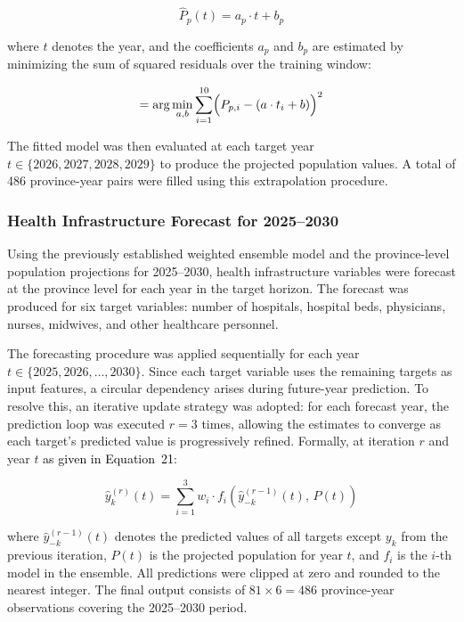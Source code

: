 \documentclass[final, 9pt, twocolumn]{saucis}
\newcommand{\rev}[1]{\textcolor{black}{#1}}
\begin{document}
\begin{equation}
    \hat{P}_{p}(t) = a_p \cdot t + b_p
\end{equation}

where $t$ denotes the year, and the coefficients $a_p$ and $b_p$ are estimated by minimizing the sum of squared residuals over the training window:

\begin{equation}
    [a_p,\, b_p] = \arg\min_{a,b} \sum_{i=1}^{10} 
    \Bigl(P_{p,i} - (a \cdot t_i + b)\Bigr)^{2}
\end{equation}

The fitted model was then evaluated at each target year $t \in \{2026, 2027, 2028, 2029\}$ to produce the projected population values. A total of 486 province-year pairs were filled using this extrapolation procedure.

\subsubsection{Health Infrastructure Forecast for 2025--2030}

Using the previously established weighted ensemble model and the 
province-level population projections for 2025--2030, health 
infrastructure variables were forecast at the province level for 
each year in the target horizon. The forecast was produced for 
six target variables: number of hospitals, hospital beds, physicians, nurses, midwives, and other healthcare personnel.

The forecasting procedure was applied sequentially for each year 
$t \in \{2025, 2026, \ldots, 2030\}$. Since each target variable 
uses the remaining targets as input features, a circular dependency arises during future-year prediction. To resolve this, an iterative update strategy was adopted: for each forecast year, the prediction loop was executed $r = 3$ times, allowing the estimates to converge as each target's predicted value is progressively refined. Formally, at iteration $r$ and year $t$ \rev{as given in Equation~21}:

\begin{equation}
    \hat{y}_k^{(r)}(t) = \sum_{i=1}^{3} w_i \cdot 
    f_i\!\left(\hat{y}_{-k}^{(r-1)}(t),\, P(t)\right)
\end{equation}

where $\hat{y}_{-k}^{(r-1)}(t)$ denotes the predicted values of 
all targets except $y_k$ from the previous iteration, $P(t)$ is 
the projected population for year $t$, and $f_i$ is the $i$-th 
model in the ensemble. All predictions were clipped at zero and 
rounded to the nearest integer. The final output consists of 
$81 \times 6 = 486$ province-year observations covering the 
2025--2030 period.
\end{document}

